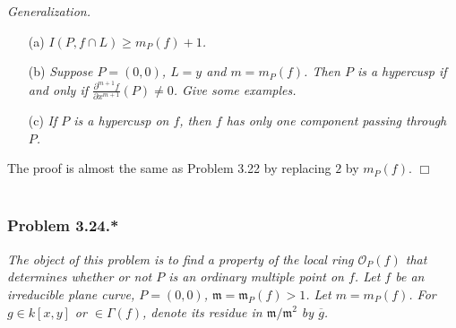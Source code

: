 \documentclass{article}
\begin{document}
\emph{Generalization.}
\begin{enumerate}
\item[(a)]
  \emph{$I(P, f \cap L) \geq m_P(f) + 1$.}

\item[(b)]
  \emph{Suppose $P = (0,0)$, $L = y$ and $m = m_P(f)$.
  Then $P$ is a hypercusp if and only if
  $\frac{\partial^{m+1} f}{\partial x^{m+1}}(P) \neq 0$. Give some examples.}

\item[(c)]
  \emph{If $P$ is a hypercusp on $f$,
  then $f$ has only one component passing through $P$.}
\end{enumerate}
The proof is almost the same as Problem 3.22 by replacing $2$ by $m_P(f)$.
$\Box$ \\\\






\subsubsection*{Problem 3.24.*}
\emph{The object of this problem is
to find a property of the local ring $\mathscr{O}_P(f)$ that
determines whether or not $P$ is an ordinary multiple point on $f$.
Let $f$ be an irreducible plane curve, $P = (0, 0)$, $\mathfrak{m} = \mathfrak{m}_P(f) > 1$.
Let $m = m_P(f)$.
For $g \in k[x,y]$ or $\in \Gamma(f)$,
denote its residue in $\mathfrak{m}/\mathfrak{m}^2$ by $\overline{g}$.}
\end{document}
